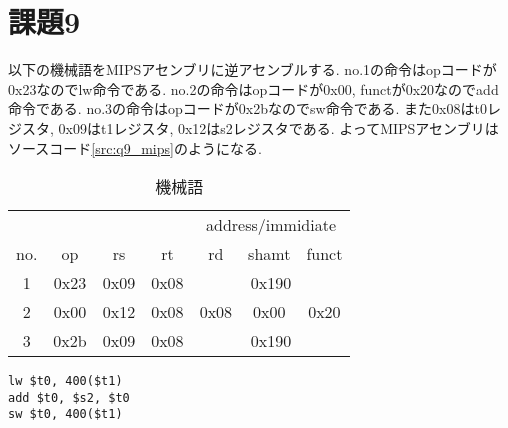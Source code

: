 \section{課題9}
以下の機械語をMIPSアセンブリに逆アセンブルする.
no.1の命令はopコードが0x23なのでlw命令である.
no.2の命令はopコードが0x00, functが0x20なのでadd命令である.
no.3の命令はopコードが0x2bなのでsw命令である.
また0x08はt0レジスタ, 0x09はt1レジスタ, 0x12はs2レジスタである.
よってMIPSアセンブリはソースコード\ref{src:q9_mips}のようになる.
\begin{table}[h]
\caption{機械語}
\label{tab:q9_machine}
\centering
\begin{tabular}{c|c|c|c|c|c|c}
\hline
&&&&\multicolumn{3}{c}{address/immidiate}\\
no.&op&rs&rt&rd&shamt&funct\\
\hline \hline
1&0x23&0x09&0x08&\multicolumn{3}{c}{0x190}\\\hline
2&0x00&0x12&0x08&0x08&0x00&0x20\\\hline
3&0x2b&0x09&0x08&\multicolumn{3}{c}{0x190}\\
\hline
\end{tabular}
\end{table}
\begin{lstlisting}[caption=MIPSアセンブリコード, label=src:q9_mips]
lw $t0, 400($t1)
add $t0, $s2, $t0
sw $t0, 400($t1)
\end{lstlisting}